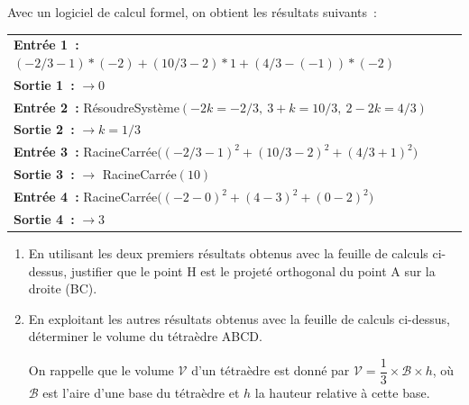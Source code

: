 \begin{enumerate}
Avec un logiciel de calcul formel, on obtient les résultats suivants~:

\begin{center}
\begin{tabular}{|p{8.5cm}|}\hline
\textbf{Entrée 1~:} $(-2/3-1)*(-2)+(10/3-2)*1+(4/3-(-1))*(-2)$\\
\textbf{Sortie 1~:} $\rightarrow 0$\\
\hline
\textbf{Entrée 2~:} RésoudreSystème$(-2k=-2/3,\ 3+k=10/3,\ 2-2k=4/3)$\\
\textbf{Sortie 2~:} $\rightarrow k = 1/3$\\
\hline
\textbf{Entrée 3~:} RacineCarrée$\big((-2/3-1)^2+(10/3-2)^2+(4/3+1)^2\big)$\\
\textbf{Sortie 3~:} $\rightarrow$ RacineCarrée$(10)$\\
\hline
\textbf{Entrée 4~:} RacineCarrée$\big((-2-0)^2+(4-3)^2+(0-2)^2\big)$\\
\textbf{Sortie 4~:} $\rightarrow 3$\\
\hline
\end{tabular}
\end{center}

	\begin{enumerate}[label=\textbf{\alph*.}]
		\item En utilisant les deux premiers résultats obtenus avec la feuille de calculs ci-dessus, justifier que le point H est le projeté orthogonal du point A sur la droite (BC).
		\item En exploitant les autres résultats obtenus avec la feuille de calculs ci-dessus, déterminer le volume du tétraèdre ABCD.

On rappelle que le volume $\mathcal{V}$ d'un tétraèdre est donné par $\mathcal{V} = \dfrac{1}{3}\times\mathcal{B}\times h$, où $\mathcal{B}$ est l'aire d'une base du tétraèdre et $h$ la hauteur relative à cette base.
	\end{enumerate}
\end{enumerate}
